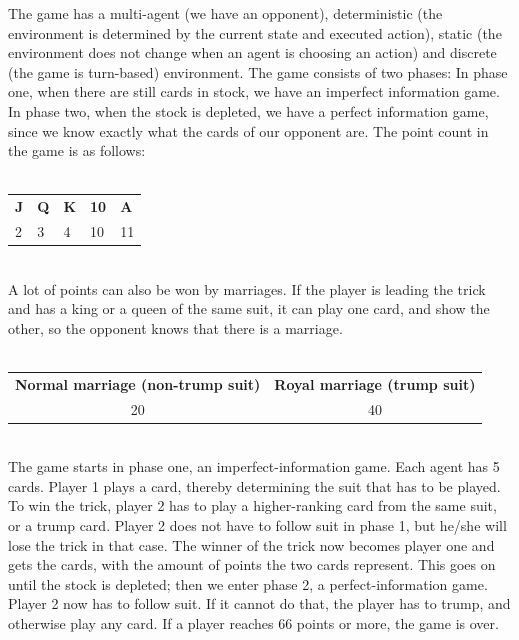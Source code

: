 \documentclass[a4paper,11pt]{article}
\begin{document}
The game has a multi-agent (we have an opponent), deterministic (the environment is determined by the current state and executed action), static (the environment does not change when an agent is choosing an action) and discrete (the game is turn-based) environment. The game consists of two phases: In phase one, when there are still cards in stock, we have an imperfect information game. In phase two, when the stock is depleted, we have a perfect information game, since we know exactly what the cards of our opponent are. The point count in the game is as follows: \\ \\
\noindent
\begin{tabular}{l l l l l}
\textbf{J} & \textbf{Q} & \textbf{K} & \textbf{10} & \textbf{A} \\
2 & 3 & 4 & 10 & 11 \\
\end{tabular} \\

\noindent
A lot of points can also be won by marriages. If the player is leading the trick and has a king or a queen of the same suit, it can play one card, and show the other, so the opponent knows that there is a marriage.\\ \\
\noindent
\begin{tabular} {c c}
\textbf{Normal marriage (non-trump suit)} & \textbf{Royal marriage (trump suit)} \\
20 & 40 \\
\end{tabular}\\

\noindent
The game starts in phase one, an imperfect-information game. Each agent has 5 cards. Player 1 plays a card, thereby determining the suit that has to be played. To win the trick, player 2 has to play a higher-ranking card from the same suit, or a trump card. Player 2 does not have to follow suit in phase 1, but he/she will lose the trick in that case. The winner of the trick now becomes player one and gets the cards, with the amount of points the two cards represent. This goes on until the stock is depleted; then we enter phase 2, a perfect-information game. Player 2 now has to follow suit. If it cannot do that, the player has to trump, and otherwise play any card. If a player reaches 66 points or more, the game is over.
\end{document}
